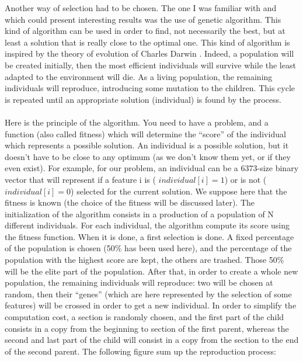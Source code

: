 \documentclass{report}
\begin{document}
	Another way of selection had to be chosen. The one I was familiar with and which could present interesting results was the use of genetic algorithm. This kind of algorithm can be used in order to find, not necessarily the best, but at least a solution that is really close to the optimal one. This kind of algorithm is inspired by the theory of evolution of Charles Darwin  \cite{darwin1859origins}. Indeed, a population will be created initially, then the most efficient individuals will survive while the least adapted to the environment will die. As a living population, the remaining individuals will reproduce, introducing some mutation to the children. This cycle is repeated until an appropriate solution (individual) is found by the process.\\\\
	Here is the principle of the algorithm. You need to have a problem, and a function (also called fitness) which will determine the “score” of the individual which represents a possible solution. An individual is a possible solution, but it doesn't have to be close to any optimum (as we don't know them yet, or if they even exist). For example, for our problem, an individual can be a $6373$-size binary vector that will represent if a feature i is ( $individual[i] = 1$) or is not ($individual[i] = 0$) selected for the current solution. We suppose here that the fitness is known (the choice of the fitness will be discussed later).
	The initialization of the algorithm consists in a production of a population of N different individuals. For each individual, the algorithm compute its score using the fitness function. When it is done, a first selection is done. A fixed percentage of the population is chosen (50\% has been used here), and the percentage of the population with the highest score are kept, the others are trashed. Those 50\% will be the elite part of the population. After that, in order to create a whole new population, the remaining individuals will reproduce: two will be chosen at random, then their “genes” (which are here represented by the selection of some features) will be crossed in order to get a new individual. In order to simplify the computation cost, a section is randomly chosen, and the first part of the child consists in a copy from the beginning to section of the first parent, whereas the second and last part of the child will consist in a copy from the section to the end of the second parent. The following figure sum up the reproduction process:
	
\end{document}
